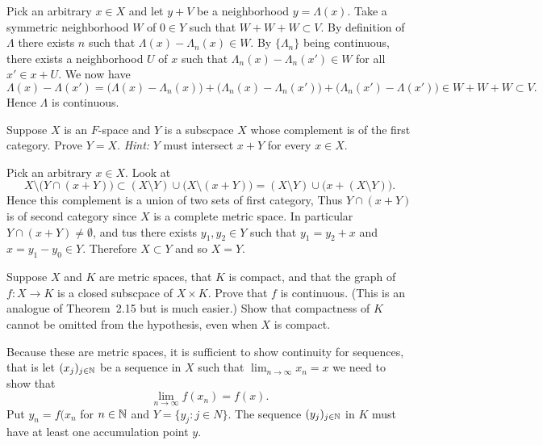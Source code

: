 \begin{enumerate}
\begin{itemize}
  Pick an arbitrary \(x\in X\) and let $y+V$ 
  be a neighborhood  \(y=\Lambda(x)\).
  Take a symmetric neighborhood $W$ of \(0\in Y\) such that
  \(W + W + W \subset V\).
  By definition of \(\Lambda\) there exists $n$ such that
  \(\Lambda(x) - \Lambda_n(x) \in W\).
  By \(\{\Lambda_n\}\) being continuous, there exists a neighborhood $U$
  of $x$ such that  \(\Lambda_n(x) - \Lambda_n(x') \in W\) for all \(x'\in x+U\).
  We now have
  \begin{equation*}
  \Lambda(x) - \Lambda(x') = 
      \bigl(\Lambda(x) - \Lambda_n(x)\bigr)
   +  \bigl(\Lambda_n(x) - \Lambda_n(x')\bigr)
   +  \bigl(\Lambda_n(x') - \Lambda(x')\bigr)
   \in W + W + W \subset V.
  \end{equation*}
  Hence \(\Lambda\) is continuous.

\end{itemize}

\begin{excopy}
Suppose $X$ is an $F$-space and $Y$ is a subscpace $X$ whose complement
is of the first category. Prove \(Y=X\).
\emph{Hint:} $Y$ must intersect \(x+Y\) for every \(x\in X\).
\end{excopy}

Pick an arbitrary \(x\in X\).
Look at 
\begin{equation*}
X \setminus \bigl(Y \cap (x+Y)\bigr)
\subset (X\setminus Y) \cup \bigl(X \setminus (x+Y)\bigr)
= (X\setminus Y) \cup \bigl(x+(X \setminus Y)\bigr).
\end{equation*}
Hence this complement is a union of two sets of first category,
Thus \(Y \cap (x+Y)\) is of second category since $X$ is a complete metric space.
In particular \(Y \cap (x+Y)\neq \emptyset\), and tus there exists
\(y_1,y_2 \in Y\) such that \(y_1 = y_2 + x\)
and \(x = y_1 - y_0 \in Y\). Therefore \(X\subset Y\) and so \(X=Y\).

\begin{excopy}
Suppose $X$ and $K$ are metric spaces, that $K$ is compact,
and that the graph of \(f: X\to K\) is a closed subscpace of \(X\times K\).
Prove that $f$ is continuous.
(This is an analogue of Theorem~2.15 but is much easier.)
Show that compactness of $K$ cannot be omitted from the hypothesis,
even when $X$ is compact.
\end{excopy}

Because these are metric spaces, it is sufficient
to show continuity for sequences, that is let 
\((x_j)_{j\in\mathbb{N}}\) be a sequence in $X$ such that \(\lim_{n\to\infty} x_n = x\)
we need to show that 
\begin{equation} \label{eq:ex2.16}
\lim_{n\to\infty} f(x_n) = f(x).
\end{equation}
Put \(y_n = f(x_n\) for \(n\in\mathbb{N}\) and \(Y=\{y_j: j\in N\}\).
The sequence \((y_j)_{j\in\mathbb{N}}\) in $K$ must have at least 
one accumulation point $y$.


\end{enumerate}
